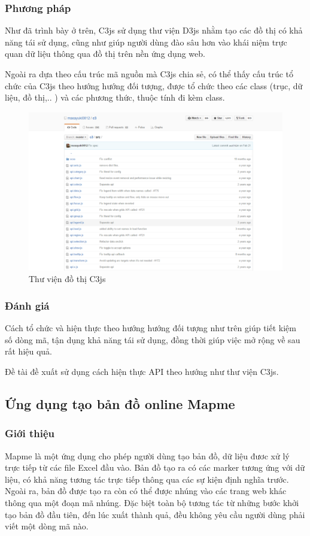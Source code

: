\documentclass[12pt,a4paper]{article}
\begin{document}
\subsubsection{Phương pháp}
Như đã trình bày ở trên, C3js sử dụng thư viện D3js nhằm tạo các đồ thị có khả năng tái sử dụng, cũng như giúp người dùng đào sâu hơn vào khái niệm trực quan dữ liệu thông qua đồ thị trên nền ứng dụng web.

Ngoài ra dựa theo cấu trúc mã nguồn mà C3js chia sẻ, có thể thấy cấu trúc tổ chức của C3js theo hướng hướng đối tượng, được tổ chức theo các class (trục, dữ liệu, đồ thị,.. ) và các phương thức, thuộc tính đi kèm class.

\begin{figure}[htp]
	\begin{center}
    \includegraphics[scale=.4]{image/c3source}
    \caption{Thư viện đồ thị C3js}
    \label{refhinh9}
	\end{center}
\end{figure}

\subsubsection{Đánh giá}
Cách tổ chức và hiện thực theo hướng hướng đối tượng như trên giúp tiết kiệm số dòng mã, tận dụng khả năng tái sử dụng, đồng thời giúp việc mở rộng về sau rất hiệu quả.

Đề tài đề xuất sử dụng cách hiện thực API theo hướng như thư viện C3js.

\subsection{Ứng dụng tạo bản đồ online Mapme}
\subsubsection{Giới thiệu}
Mapme\cite{mapme} là một ứng dụng cho phép người dùng tạo bản đồ, dữ liệu đươc xử lý trực tiếp từ các file Excel đầu vào. Bản đồ tạo ra có các marker tương ứng với dữ liệu, có khả năng tương tác trực tiếp thông qua các sự kiện định nghĩa trước. Ngoài ra, bản đồ được tạo ra còn có thể được nhúng vào các trang web khác thông qua một đoạn mã nhúng. Đặc biệt toàn bộ tương tác từ những bước khởi tạo bản đồ đầu tiên, đến lúc xuất thành quả, đều không yêu cầu người dùng phải viết một dòng mã nào.
\end{document}
